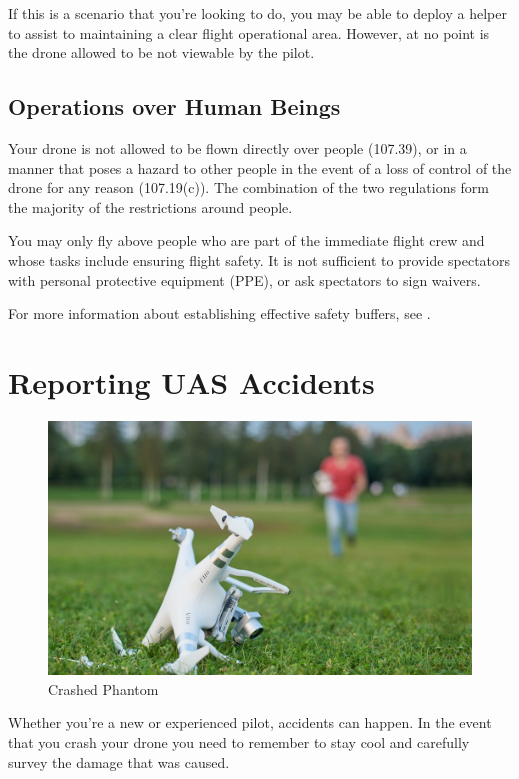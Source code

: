 \documentclass[
]{book}
\begin{document}
If this is a scenario that you're looking to do, you may be able to deploy a helper to assist to maintaining a clear flight operational area. However, at no point is the drone allowed to be not viewable by the pilot.

\hypertarget{operations-over-human-beings}{%
\section{Operations over Human Beings}\label{operations-over-human-beings}}

Your drone is not allowed to be flown directly over people (107.39), or in a manner that poses a hazard to other people in the event of a loss of control of the drone for any reason (107.19(c)). The combination of the two regulations form the majority of the restrictions around people.

You may only fly above people who are part of the immediate flight crew and whose tasks include ensuring flight safety. It is not sufficient to provide spectators with personal protective equipment (PPE), or ask spectators to sign waivers.

For more information about establishing effective safety buffers, see .

\hypertarget{ch-uas-accident}{%
\chapter{Reporting UAS Accidents}\label{ch-uas-accident}}

\begin{figure}
\centering
\includegraphics{images/DroneCrash.jpg}
\caption{Crashed Phantom}
\end{figure}

Whether you're a new or experienced pilot, accidents can happen. In the event that you crash your drone you need to remember to stay cool and carefully survey the damage that was caused.
\end{document}
